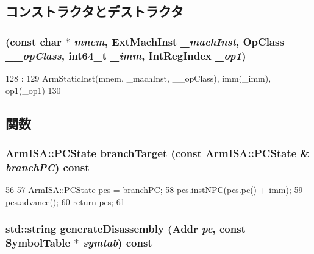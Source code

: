 \subsection{コンストラクタとデストラクタ}
\hypertarget{classArmISA_1_1BranchImmReg64_ae8be9e127f0ed118d74a515f5d04d475}{
\subsubsection[{BranchImmReg64}]{ (const char $\ast$ {\em mnem}, \/  {\bf ExtMachInst} {\em \_\-machInst}, \/  OpClass {\em \_\-\_\-opClass}, \/  int64\_\-t {\em \_\-imm}, \/  {\bf IntRegIndex} {\em \_\-op1})}}
\label{classArmISA_1_1BranchImmReg64_ae8be9e127f0ed118d74a515f5d04d475}



\begin{DoxyCode}
128                                                    :
129         ArmStaticInst(mnem, _machInst, __opClass), imm(_imm), op1(_op1)
130     {}

\end{DoxyCode}


\subsection{関数}
\hypertarget{classArmISA_1_1BranchImmReg64_aef1dd7539a8d8c49730120f2c0b8088e}{
\subsubsection[{branchTarget}]{\setlength{\rightskip}{0pt plus 5cm}ArmISA::PCState branchTarget (const ArmISA::PCState \& {\em branchPC}) const}}
\label{classArmISA_1_1BranchImmReg64_aef1dd7539a8d8c49730120f2c0b8088e}



\begin{DoxyCode}
56 {
57     ArmISA::PCState pcs = branchPC;
58     pcs.instNPC(pcs.pc() + imm);
59     pcs.advance();
60     return pcs;
61 }
\end{DoxyCode}
\hypertarget{classArmISA_1_1BranchImmReg64_a95d323a22a5f07e14d6b4c9385a91896}{
\subsubsection[{generateDisassembly}]{\setlength{\rightskip}{0pt plus 5cm}std::string generateDisassembly ({\bf Addr} {\em pc}, \/  const SymbolTable $\ast$ {\em symtab}) const}}
\label{classArmISA_1_1BranchImmReg64_a95d323a22a5f07e14d6b4c9385a91896}



